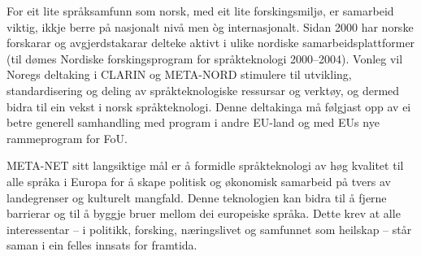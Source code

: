 \begin{multicols}{2}
For eit lite språksamfunn som norsk, med eit lite forskingsmiljø, er samarbeid viktig, ikkje berre på nasjonalt nivå men òg internasjonalt. Sidan 2000 har norske forskarar og avgjerdstakarar delteke aktivt i ulike nordiske samarbeidsplattformer  (til dømes Nordiske forskingsprogram for språkteknologi 2000–2004). Vonleg vil Noregs deltaking i CLARIN og META-NORD stimulere til utvikling, standardisering og deling av språkteknologiske ressursar og verktøy, og dermed bidra til ein vekst i norsk språkteknologi.
Denne deltakinga må følgjast opp av ei betre generell samhandling med program i andre EU-land og med EUs nye rammeprogram for FoU.



META-NET sitt langsiktige mål er å formidle språkteknologi av høg kvalitet til alle språka i Europa for å skape politisk og økonomisk samarbeid på tvers av landegrenser og kulturelt mangfald. Denne teknologien kan bidra til å fjerne barrierar og til å byggje bruer mellom dei europeiske språka. Dette krev at alle interessentar – i politikk, forsking, næringslivet og samfunnet som heilskap – står saman i ein felles innsats for framtida.

\end{multicols}

\clearpage

